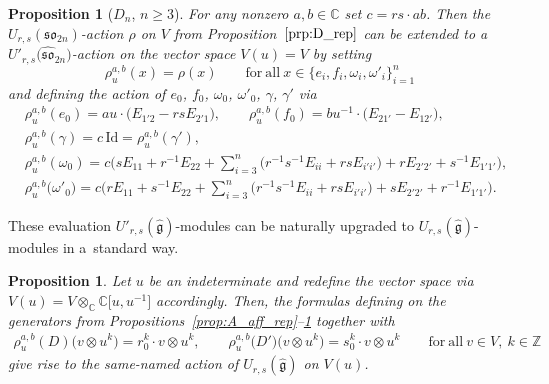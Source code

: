 \documentclass[10pt,a4paper]{amsart}
\numberwithin{equation}{section}
\newtheorem{Proposition}[Theorem]{Proposition}
 { \theoremstyle{definition}
\newtheorem{Definition}[Theorem]{Definition}
\newtheorem{Note}[Theorem]{Note}
\newtheorem{Example}[Theorem]{Example}
\newtheorem{Remark}[Theorem]{Remark} }
\newcommand{\fg}{\mathfrak{g}}
\newcommand{\BZ}{\mathbb{Z}}
\newcommand{\BC}{\mathbb{C}}
\newcommand{\sso}{\mathfrak{so}}
\newcommand{\UU}{U_{r,s}(\widehat{\fg})}
\newcommand{\Uu}{U'_{r,s}(\widehat{\fg})}
\newcommand{\Id}{\mathrm{Id}}
\begin{document}
\begin{Proposition}[$D_n$, $n\geq 3$]\label{prop:D_aff_rep}
For any nonzero $a,b\in \BC$ set $c=rs\cdot ab$. Then the $U_{r,s}(\sso_{2n})$-action $\rho$ on $V$ from Proposition~$\ref{prp:D_rep}$ can be extended to a $U'_{r,s}\bigl(\widehat{\sso}_{2n}\bigr)$-action  on the vector space $V(u)=V$ by setting
\begin{displaymath}
 \rho^{a,b}_u(x)=\rho(x) \qquad \mathrm{for\ all} \ x\in \bigl\{e_i,f_i,\omega_i,\omega'_i\bigr\}_{i=1}^{n}
\end{displaymath}
and defining the action of $e_0$, $f_0$, $\omega_0$, $\omega'_0$, $\gamma$, $\gamma'$ via
\begin{displaymath}
\begin{split}
 & \rho^{a,b}_u(e_0)=au \cdot \bigl(E_{1' 2} - rs E_{2' 1} \bigr), \qquad
 \rho^{a,b}_u(f_0)=bu^{-1} \cdot \bigl(E_{2 1'}-E_{1 2'}), \\
 &\rho^{a,b}_u(\gamma)=c \, \Id=\rho^{a,b}_u(\gamma') , \\
 & \rho^{a,b}_u(\omega_0)=
 c\Biggl( sE_{11}+r^{-1}E_{22}+\sum_{i=3}^{n} \bigl( r^{-1}s^{-1}E_{ii} + rs E_{i'i'}\bigr) +
 rE_{2' 2'} + s^{-1}E_{1' 1'} \Biggr), \\
 & \rho^{a,b}_u\big(\omega'_0\big)=
 c\Biggl( rE_{11}+s^{-1}E_{22}+\sum_{i=3}^{n} \bigl( r^{-1}s^{-1}E_{ii} + rs E_{i'i'}\bigr) +
 sE_{2' 2'} + r^{-1}E_{1' 1'} \Biggr).
\end{split}
\end{displaymath}
\end{Proposition}

These evaluation $\Uu$-modules  can be naturally upgraded to $\UU$-modules in a~standard way.

\begin{Proposition}\label{prop:affine-actions-withD}
Let $u$ be an indeterminate and redefine the vector space via $V(u)=V\otimes_\BC \BC\big[u,u^{-1}\big]$ accordingly. Then, the formulas defining  on the generators from Propositions~{\rm \ref{prop:A_aff_rep}--\ref{prop:D_aff_rep}} together with
\begin{gather*}
 \rho^{a,b}_u(D) \bigl(v\otimes u^k\bigr) = r_0^k \cdot v\otimes u^k , \qquad
 \rho^{a,b}_u\bigl(D'\bigr) \bigl(v\otimes u^k\bigr) = s_0^k \cdot v\otimes u^k \qquad
 \mathrm{for\ all} \ v\in V,\ k\in \BZ
\end{gather*}
give rise to the same-named action  of $\UU$ on $V(u)$.
\end{Proposition}
\end{document}

